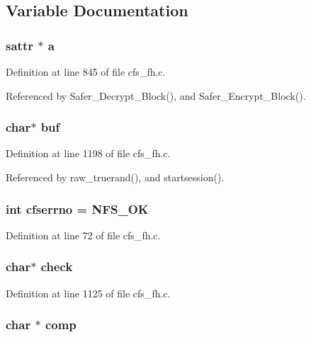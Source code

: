 \subsection{Variable Documentation}
\subsubsection{\setlength{\rightskip}{0pt plus 5cm}sattr $\ast$ {\bf a}}\label{cfs__fh_8c_a26}




Definition at line 845 of file cfs\_\-fh.c.

Referenced by Safer\_\-Decrypt\_\-Block(), and Safer\_\-Encrypt\_\-Block().
\subsubsection{\setlength{\rightskip}{0pt plus 5cm}char$\ast$ {\bf buf}}\label{cfs__fh_8c_a34}




Definition at line 1198 of file cfs\_\-fh.c.

Referenced by raw\_\-truerand(), and startsession().
\subsubsection{\setlength{\rightskip}{0pt plus 5cm}int {\bf cfserrno} = NFS\_\-OK}\label{cfs__fh_8c_a7}




Definition at line 72 of file cfs\_\-fh.c.
\subsubsection{\setlength{\rightskip}{0pt plus 5cm}char$\ast$ {\bf check}}\label{cfs__fh_8c_a33}




Definition at line 1125 of file cfs\_\-fh.c.
\subsubsection{\setlength{\rightskip}{0pt plus 5cm}char $\ast$ {\bf comp}}\label{cfs__fh_8c_a27}




